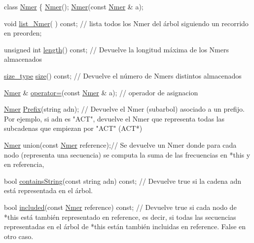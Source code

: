 \begin{DoxyCode}
\textcolor{keyword}{class }\hyperlink{classNmer}{Nmer} \{
  \hyperlink{classNmer_ac2a651dd05b03e716b877c26386d772e}{Nmer}();
  \hyperlink{classNmer_ac2a651dd05b03e716b877c26386d772e}{Nmer}(\textcolor{keyword}{const} \hyperlink{classNmer}{Nmer} & a);

  
  \textcolor{keywordtype}{void} \hyperlink{classNmer_a1ce1c0cb174d94685c7234f58f9dc119}{list\_Nmer}( ) \textcolor{keyword}{const}; \textcolor{comment}{// lista todos los Nmer del árbol siguiendo un recorrido en preorden;}

  \textcolor{keywordtype}{unsigned} \textcolor{keywordtype}{int} \hyperlink{classNmer_a60e2335600c01ee39e865790015818f0}{length}() \textcolor{keyword}{const}; \textcolor{comment}{// Devuelve la longitud máxima de los Nmers almacenados}

  \hyperlink{classNmer_a1b8892df885de3ac91edf3abd8f1b55d}{size\_type} \hyperlink{classNmer_accdea65838fcd53c48a2d05f6809643f}{size}() \textcolor{keyword}{const}; \textcolor{comment}{// Devuelve el número de Nmers distintos almacenados}

  \hyperlink{classNmer}{Nmer} &  \hyperlink{classNmer_a129843cfe04a63a199ac641117c052cc}{operator=}(\textcolor{keyword}{const} \hyperlink{classNmer}{Nmer} & a);  \textcolor{comment}{// operador de asignacion}

  \hyperlink{classNmer}{Nmer} \hyperlink{classNmer_adf184ca659cf3ce3f2db301acae40e56}{Prefix}(\textcolor{keywordtype}{string} adn); \textcolor{comment}{// Devuelve el Nmer (subarbol) asociado a un prefijo. Por ejemplo, si
       adn es "ACT", devuelve el Nmer que representa todas las subcadenas que empiezan por "ACT" (ACT*)}

  \hyperlink{classNmer}{Nmer} \textcolor{keyword}{union}(\textcolor{keyword}{const} \hyperlink{classNmer}{Nmer} reference);\textcolor{comment}{// Se devuelve un Nmer donde para cada nodo (representa una
       secuencia) se computa la suma de las frecuencias en *this y en referencia, }

  \textcolor{keywordtype}{bool} \hyperlink{classNmer_a3aa6c3d317ab01bd6b8c53434f50d03f}{containsString}(\textcolor{keyword}{const} \textcolor{keywordtype}{string} adn) \textcolor{keyword}{const}; \textcolor{comment}{// Devuelve true si la cadena adn está
       representada en el árbol. }

  \textcolor{keywordtype}{bool} \hyperlink{classNmer_ac5af1362b3f8ef4141574e62bc3510ac}{included}(\textcolor{keyword}{const} \hyperlink{classNmer}{Nmer} reference) \textcolor{keyword}{const}; \textcolor{comment}{// Devuelve true si cada nodo de *this está
       también representado en reference, es decir, si todas las secuencias representadas en el árbol de *this están
       también incluidas en reference. False en otro caso.}


\end{DoxyCode}
